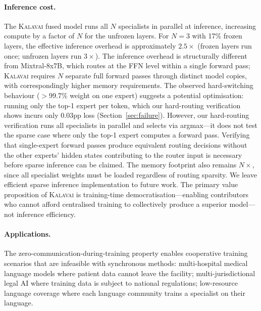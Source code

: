 \documentclass{article}
\newcommand{\kalavai}{\textsc{Kalavai}\xspace}
\begin{document}
\paragraph{Inference cost.} The \kalavai fused model runs all $N$ specialists in parallel at inference, increasing compute by a factor of $N$ for the unfrozen layers. For $N=3$ with 17\% frozen layers, the effective inference overhead is approximately $2.5\times$ (frozen layers run once; unfrozen layers run $3\times$). The inference overhead is structurally different from Mixtral-8x7B, which routes at the FFN level within a single forward pass; \kalavai requires $N$ separate full forward passes through distinct model copies, with correspondingly higher memory requirements. The observed hard-switching behaviour ($>$99.7\% weight on one expert) suggests a potential optimisation: running only the top-1 expert per token, which our hard-routing verification shows incurs only 0.03pp loss (Section~\ref{sec:failure}). However, our hard-routing verification runs all specialists in parallel and selects via argmax---it does not test the sparse case where only the top-1 expert computes a forward pass. Verifying that single-expert forward passes produce equivalent routing decisions without the other experts' hidden states contributing to the router input is necessary before sparse inference can be claimed. The memory footprint also remains $N\times$, since all specialist weights must be loaded regardless of routing sparsity. We leave efficient sparse inference implementation to future work. The primary value proposition of \kalavai is training-time democratisation---enabling contributors who cannot afford centralised training to collectively produce a superior model---not inference efficiency.

\paragraph{Applications.} The zero-communication-during-training property enables cooperative training scenarios that are infeasible with synchronous methods: multi-hospital medical language models where patient data cannot leave the facility; multi-jurisdictional legal AI where training data is subject to national regulations; low-resource language coverage where each language community trains a specialist on their language.
\end{document}
